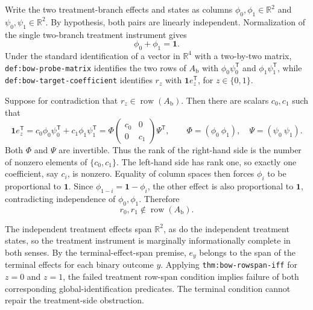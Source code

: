 Write the two treatment-branch effects and states as columns \(\phi_0,\phi_1\in\mathbb R^2\) and \(\psi_0,\psi_1\in\mathbb R^2\).  By hypothesis, both pairs are linearly independent.  Normalization of the single two-branch treatment instrument gives
\[
 \phi_0+\phi_1=\mathbf 1.
\]
Under the standard identification of a vector in \(\mathbb R^4\) with a two-by-two matrix, \texttt{def:bow-probe-matrix} identifies the two rows of \(A_{\mathrm b}\) with \(\phi_0\psi_0^{\mathsf T}\) and \(\phi_1\psi_1^{\mathsf T}\), while \texttt{def:bow-target-coefficient} identifies \(r_z\) with \(\mathbf 1e_z^{\mathsf T}\), for \(z\in\{0,1\}\).

Suppose for contradiction that \(r_z\in\operatorname{row}(A_{\mathrm b})\).  Then there are scalars \(c_0,c_1\) such that
\[
 \mathbf 1e_z^{\mathsf T}
 =c_0\phi_0\psi_0^{\mathsf T}+c_1\phi_1\psi_1^{\mathsf T}
 =\Phi\begin{pmatrix}c_0&0\\0&c_1\end{pmatrix}\Psi^{\mathsf T},
 \qquad
 \Phi=(\phi_0\ \phi_1),\quad \Psi=(\psi_0\ \psi_1).
\]
Both \(\Phi\) and \(\Psi\) are invertible.  Thus the rank of the right-hand side is the number of nonzero elements of \(\{c_0,c_1\}\).  The left-hand side has rank one, so exactly one coefficient, say \(c_i\), is nonzero.  Equality of column spaces then forces \(\phi_i\) to be proportional to \(\mathbf 1\).  Since \(\phi_{1-i}=\mathbf 1-\phi_i\), the other effect is also proportional to \(\mathbf 1\), contradicting independence of \(\phi_0,\phi_1\).  Therefore
\[
 r_0,r_1\notin\operatorname{row}(A_{\mathrm b}).
\]

The independent treatment effects span \(\mathbb R^2\), as do the independent treatment states, so the treatment instrument is marginally informationally complete in both senses.  By the terminal-effect-span premise, \(e_y\) belongs to the span of the terminal effects for each binary outcome \(y\).  Applying \texttt{thm:bow-rowspan-iff} for \(z=0\) and \(z=1\), the failed treatment row-span condition implies failure of both corresponding global-identification predicates.  The terminal condition cannot repair the treatment-side obstruction.